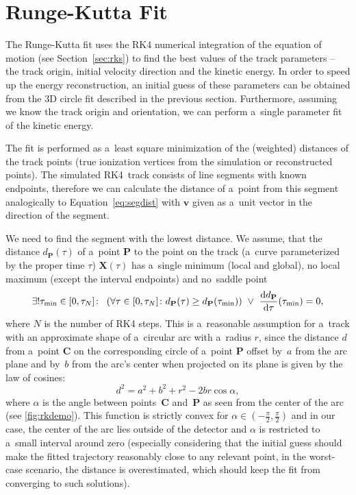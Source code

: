 	\section{Runge-Kutta Fit}
	\label{sec:rkfit}
		The Runge-Kutta fit uses the \acf{RK4} numerical integration of the equation of motion (see Section~\ref{sec:rks}) to find the best values of the track parameters -- the track origin, initial velocity direction and the kinetic energy. In order to speed up the energy reconstruction, an initial guess of these parameters can be obtained from the 3D circle fit described in the previous section. Furthermore, assuming we know the track origin and orientation, we can perform a~single parameter fit of the kinetic energy.
		
		The fit is performed as a~least square minimization of the (weighted) distances of the track points (true ionization vertices from the simulation or reconstructed points). The simulated \ac{RK4}~track consists of line segments with known endpoints, therefore we can calculate the distance of a~point from this segment analogically to Equation~\ref{eq:segdist} with $\mathbf{v}$ given as a~unit vector in the direction of the segment.
		
		We need to find the segment with the lowest distance. We assume, that the distance $d_\mathbf{P}(\tau)$ of a~point $\mathbf{P}$ to the point on the track (a~curve parameterized by the proper time $\tau$) $\mathbf{X}(\tau)$ has a~single minimum (local and global), no local maximum (except the interval endpoints) and no~saddle point
			\begin{equation}
				\label{eq:rk_assum}
				\exists!\tau_\text{min}\in[0,\tau_N]\colon\ \left(\forall\tau\in[0,\tau_N]\colon  d_{\mathbf{P}}(\tau) \geq d_{\mathbf{P}}(\tau_\text{min})\right)\ \lor\ \dv{d_{\mathbf{P}}}{\tau}{(\tau_\text{min})} = 0,
			\end{equation}
		where $N$ is the number of \ac{RK4} steps. This is a~reasonable assumption for a~track with an approximate shape of a~circular arc with a~radius $r$, since the distance $d$ from a~point $\mathbf{C}$ on the corresponding circle of a~point $\mathbf{P}$ offset by~$a$ from the arc plane and by~$b$ from the arc's center when projected on its plane is given by the law of cosines:
			\begin{equation}
				\label{eq:rkdemo}
				d^2 = a^2+b^2+r^2 - 2br\cos\alpha,
			\end{equation}
		where $\alpha$ is the angle between points~$\mathbf{C}$ and~$\mathbf{P}$ as seen from the center of the arc (see \cref{fig:rkdemo}). This function is strictly convex for $\alpha\in\left(-\frac{\pi}{2},\frac{\pi}{2}\right)$ and in our case, the center of the arc lies outside of the detector and $\alpha$ is restricted to a~small interval around zero (especially considering that the initial guess should make the fitted trajectory reasonably close to any relevant point, in the worst-case scenario, the distance is overestimated, which should keep the fit from converging to such solutions).
		
